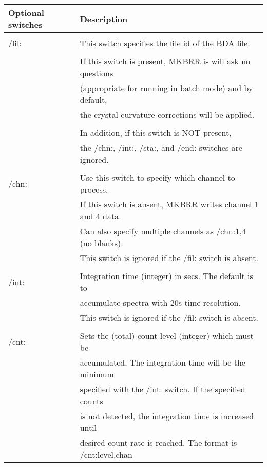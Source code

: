 \newpage

\begin{center}
\begin{tabular}{|l l|}
\hline
{\bf Optional switches} & {\bf Description}  \\
\hline
              &    \\

	/fil: & This switch specifies the file id of the BDA file.\\
              & \\
	      &	If this switch is present, MKBRR is will ask no questions \\
	      &	(appropriate for running in batch mode) and by default, \\
	      &	the crystal curvature corrections will be applied. \\
              &    \\
	      &	In addition, if this switch is NOT present,  \\
	      &	the /chn:, /int:, /sta:, and /end: switches are ignored. \\
              &    \\
	/chn: &	Use this switch to specify which channel to process.  \\
	      &	If this switch is absent, MKBRR writes channel 1 and 4 data. \\
              & Can also specify multiple channels as /chn:1,4 (no blanks). \\
              & This switch is ignored if the /fil: switch is absent. \\
              &  \\
	/int: &	Integration time (integer) in secs.  The default is to  \\
              &  accumulate spectra with 20s time resolution. \\
              &  This switch is ignored if the /fil: switch is absent. \\
              &   \\
	/cnt: &	Sets the (total) count level (integer) which must be  \\
              &  accumulated.  The integration time will be the minimum  \\
              &  specified with the /int: switch.  If the specified counts  \\
              &  is not detected, the integration time is increased until  \\
              &  desired count rate is reached.  The format is /cnt:level,chan \\

\end{tabular}
\end{center}
